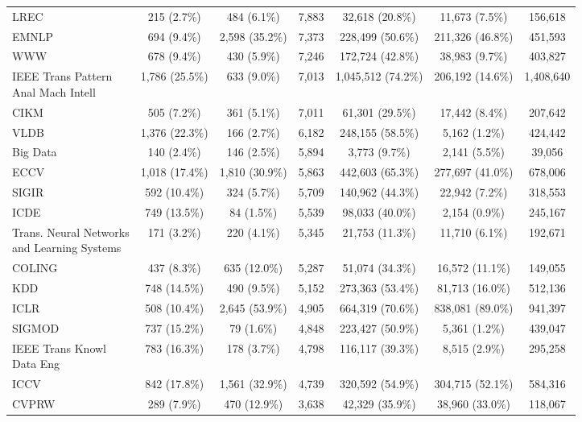 \begin{tabular}{l|ccc|ccc}
LREC & 215 (2.7\%) & 484 (6.1\%) & 7,883 & 32,618 (20.8\%) & 11,673 (7.5\%) & 156,618 \\
EMNLP & 694 (9.4\%) & 2,598 (35.2\%) & 7,373 & 228,499 (50.6\%) & 211,326 (46.8\%) & 451,593 \\
WWW & 678 (9.4\%) & 430 (5.9\%) & 7,246 & 172,724 (42.8\%) & 38,983 (9.7\%) & 403,827 \\
\makecell[l]{IEEE Trans Pattern \\ Anal Mach Intell} & 1,786 (25.5\%) & 633 (9.0\%) & 7,013 & 1,045,512 (74.2\%) & 206,192 (14.6\%) & 1,408,640 \\
CIKM & 505 (7.2\%) & 361 (5.1\%) & 7,011 & 61,301 (29.5\%) & 17,442 (8.4\%) & 207,642 \\
VLDB & 1,376 (22.3\%) & 166 (2.7\%) & 6,182 & 248,155 (58.5\%) & 5,162 (1.2\%) & 424,442 \\
Big Data & 140 (2.4\%) & 146 (2.5\%) & 5,894 & 3,773 (9.7\%) & 2,141 (5.5\%) & 39,056 \\
ECCV & 1,018 (17.4\%) & 1,810 (30.9\%) & 5,863 & 442,603 (65.3\%) & 277,697 (41.0\%) & 678,006 \\
SIGIR & 592 (10.4\%) & 324 (5.7\%) & 5,709 & 140,962 (44.3\%) & 22,942 (7.2\%) & 318,553 \\
ICDE & 749 (13.5\%) & 84 (1.5\%) & 5,539 & 98,033 (40.0\%) & 2,154 (0.9\%) & 245,167 \\
\makecell[l]{Trans. Neural Networks \\ and Learning Systems} & 171 (3.2\%) & 220 (4.1\%) & 5,345 & 21,753 (11.3\%) & 11,710 (6.1\%) & 192,671 \\
COLING & 437 (8.3\%) & 635 (12.0\%) & 5,287 & 51,074 (34.3\%) & 16,572 (11.1\%) & 149,055 \\
KDD & 748 (14.5\%) & 490 (9.5\%) & 5,152 & 273,363 (53.4\%) & 81,713 (16.0\%) & 512,136 \\
ICLR & 508 (10.4\%) & 2,645 (53.9\%) & 4,905 & 664,319 (70.6\%) & 838,081 (89.0\%) & 941,397 \\
SIGMOD & 737 (15.2\%) & 79 (1.6\%) & 4,848 & 223,427 (50.9\%) & 5,361 (1.2\%) & 439,047 \\
\makecell[l]{IEEE Trans Knowl \\ Data Eng} & 783 (16.3\%) & 178 (3.7\%) & 4,798 & 116,117 (39.3\%) & 8,515 (2.9\%) & 295,258 \\
ICCV & 842 (17.8\%) & 1,561 (32.9\%) & 4,739 & 320,592 (54.9\%) & 304,715 (52.1\%) & 584,316 \\
CVPRW & 289 (7.9\%) & 470 (12.9\%) & 3,638 & 42,329 (35.9\%) & 38,960 (33.0\%) & 118,067 \\

\end{tabular}

